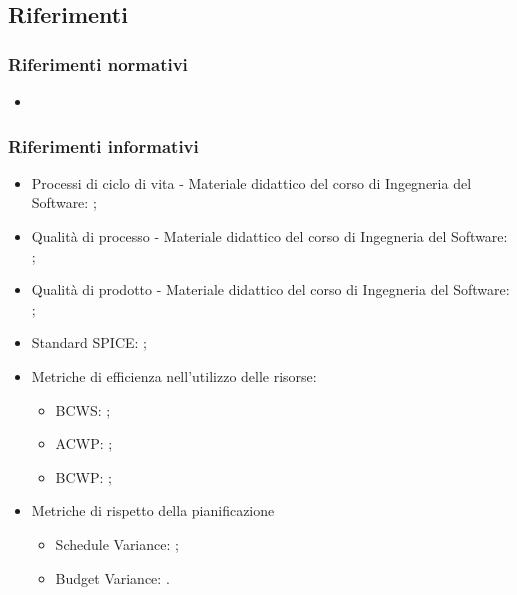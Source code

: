 \subsection{Riferimenti}
\subsubsection{Riferimenti normativi}
\begin{itemize}
    \item \textit{\NdP}
\end{itemize}
\subsubsection{Riferimenti informativi}
\begin{itemize}
    \item Processi di ciclo di vita - Materiale didattico del corso di Ingegneria del Software: ;
    \item Qualità di processo - Materiale didattico del corso di Ingegneria del Software: ;
    \item Qualità di prodotto - Materiale didattico del corso di Ingegneria del Software: ;
    \item Standard SPICE: ;
    \item Metriche di efficienza nell'utilizzo delle risorse:
    \begin{itemize}
        \item BCWS: ;
        \item ACWP: ;
        \item BCWP: ;
    \end{itemize}
    \item Metriche di rispetto della pianificazione
    \begin{itemize}
        \item Schedule Variance: ;
        \item Budget Variance: .
    \end{itemize}
\end{itemize}